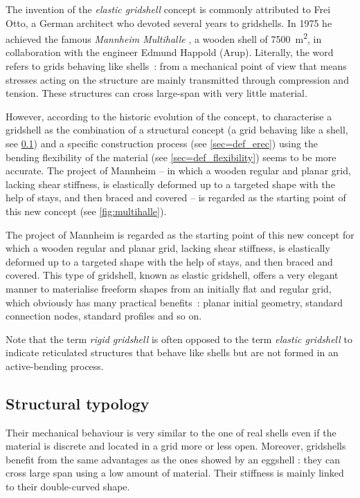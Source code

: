 The invention of the \emph{elastic gridshell} concept is commonly attributed to Frei Otto, a German architect who devoted several years to gridshells. In 1975 he achieved the famous \emph{Mannheim Multihalle} \cite{Happold1975}, a wooden shell of 7500~m\textsuperscript{2}, in collaboration with the engineer Edmund Happold (Arup).
Literally, the word  refers to grids behaving like shells~: from a mechanical point of view that means stresses acting on the structure are mainly transmitted through compression and tension. These structures can cross large-span with very little material.

However, according to the historic evolution of the concept, to characterise a gridshell as the combination of a structural concept (a grid behaving like a shell, see \cref{sec=def_topo}) and a specific construction process (see \cref{sec=def_erec}) using the bending flexibility of the material (see \cref{sec=def_flexibility}) seems to be more accurate. The project of Mannheim -- in which a wooden regular and planar grid, lacking shear stiffness, is elastically deformed up to a targeted shape with the help of stays, and then braced and covered -- is regarded as the starting point of this new concept (see \cref{fig:multihalle}).

The project of Mannheim is regarded as the starting point of this new concept for which a wooden regular and planar grid, lacking shear stiffness, is elastically deformed up to a targeted shape with the help of stays, and then braced and covered. This type of gridshell, known as elastic gridshell, offers a very elegant manner to materialise freeform shapes from an initially flat and regular grid, which obviously has many practical benefits~: planar initial geometry, standard connection nodes, standard profiles and so on.

Note that the term \emph{rigid gridshell} is often opposed to the term \emph{elastic gridshell} to indicate reticulated structures that behave like shells but are not formed in an active-bending process.

\subsection{Structural typology}\label{sec=def_topo}
Their mechanical behaviour is very similar to the one of real shells even if the material is discrete and located in a grid more or less open. Moreover, gridshells benefit from the same advantages as the ones showed by an eggshell : they can cross large span using a low amount of material. Their stiffness is mainly linked to their double-curved shape.

